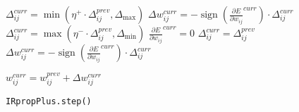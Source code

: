 \begin{algorithm}
    \BlankLine
    \BlankLine

     { \BlankLine
     { \BlankLine \BlankLine
        $\Delta_{ij}^{curr} = \min(\eta^{+} \cdot \Delta_{ij}^{prev}, \Delta_{\max})$ \BlankLine
        $\Delta w_{ij}^{curr} = -\operatorname{sign}\left(\frac{\partial E}{\partial w_{ij}}^{curr}\right) \cdot \Delta_{ij}^{curr}$
    }
     { \BlankLine \BlankLine
        $\Delta_{ij}^{curr} = \max(\eta^{-} \cdot \Delta_{ij}^{prev}, \Delta_{\min})$ \BlankLine
        ${\frac{\partial E}{\partial w_{ij}}}^{curr} = 0$
    }
     { \BlankLine \BlankLine
        $\Delta_{ij}^{curr} = \Delta_{ij}^{prev}$ \BlankLine
        $\Delta w_{ij}^{curr} = -\operatorname{sign}\left(\frac{\partial E}{\partial w_{ij}}^{curr}\right) \cdot \Delta_{ij}^{curr}$
    } \BlankLine \BlankLine

        $w_{ij}^{curr} = w_{ij}^{prev} + \Delta w_{ij}^{curr}$
    }

    \caption{\texttt{IRpropPlus.step()}}
    \label{alg:irpropplus}
\end{algorithm}